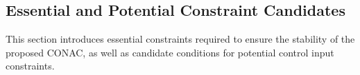 \documentclass[journal]{IEEEtran}
\begin{document}


\subsection{Essential and Potential Constraint Candidates}\label{sec:sub:cstr} 

This section introduces essential constraints required to ensure the stability of the proposed CONAC, as well as candidate conditions for potential control input constraints.
\end{document}
